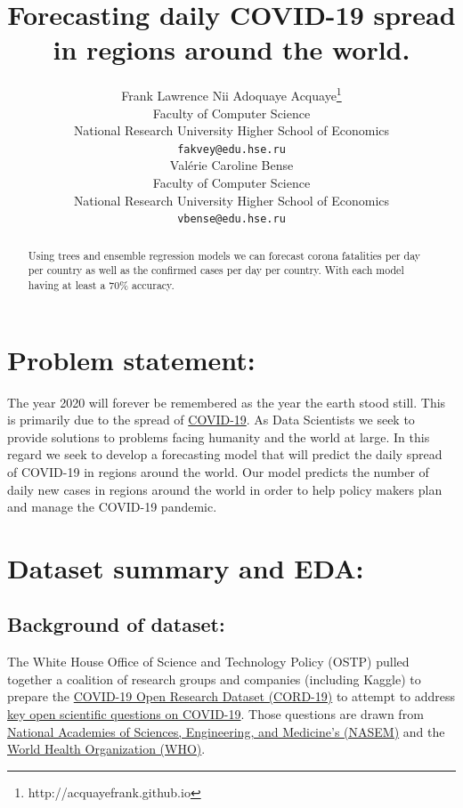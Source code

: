 \documentclass{article}
\title{Forecasting daily COVID-19 spread in regions around the world.}
\author{%
  Frank Lawrence Nii Adoquaye Acquaye\thanks{http://acquayefrank.github.io} \\
  Faculty of Computer Science\\
  National Research University Higher School of Economics\\
  \texttt{fakvey@edu.hse.ru} \\
  \And
  Valérie Caroline Bense \\
  Faculty of Computer Science\\
  National Research University Higher School of Economics\\
   \texttt{vbense@edu.hse.ru} \\
}
\begin{document}
\maketitle

\begin{abstract}
Using trees and ensemble regression models we can forecast corona fatalities per day per country as well as the confirmed cases per day per country. With each model having at least a 70\% accuracy. 
\end{abstract}

\section{Problem statement:}
The year 2020 will forever be remembered as the year the earth stood still. This is  primarily due to the spread of \href{https://en.wikipedia.org/wiki/Coronavirus_disease_2019}{COVID-19}. As Data Scientists we seek to provide solutions to problems facing humanity and the world at large. In this regard we seek to develop a forecasting model that will predict the daily spread of COVID-19 in regions around the world.  Our model predicts the number of daily new cases in regions around the world in order to help policy makers plan and manage the COVID-19 pandemic.  

\section{Dataset summary and EDA:}

\subsection{Background of dataset:}
The White House Office of Science and Technology Policy (OSTP) pulled together a coalition of research groups and companies (including Kaggle) to prepare the \href{https://www.kaggle.com/allen-institute-for-ai/CORD-19-research-challenge}{COVID-19 Open Research Dataset (CORD-19)} to attempt to address \href{https://www.kaggle.com/allen-institute-for-ai/CORD-19-research-challenge/tasks}{key open scientific questions on COVID-19}. Those questions are drawn from \href{https://www.nationalacademies.org/event/03-11-2020/standing-committee-on-emerging-infectious-diseases-and-21st-century-health-threats-virtual-meeting-1}{National Academies of Sciences, Engineering, and Medicine’s (NASEM)} and the \href{https://www.who.int/blueprint/priority-diseases/key-action/Global_Research_Forum_FINAL_VERSION_for_web_14_feb_2020.pdf?ua=1}{World Health Organization (WHO)}.
\end{document}
